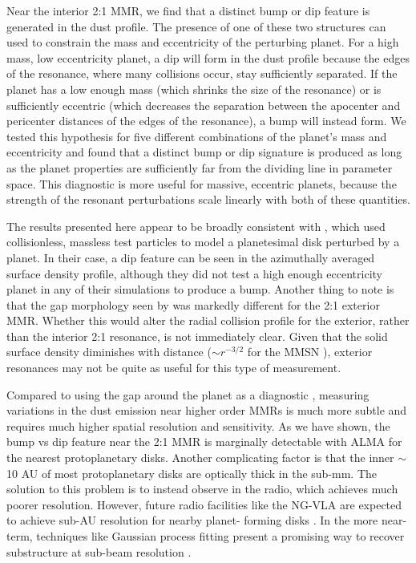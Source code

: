 \documentclass[twocolumn]{aastex63}
\begin{document}
Near the interior 2:1 MMR, we find that a distinct bump or dip feature is generated in the dust profile. The presence of one of these two structures 
can used to constrain the mass and eccentricity of the perturbing planet. For a high mass, low eccentricity planet, a dip will form in the dust profile 
because the edges of the resonance, where many collisions occur, stay sufficiently separated. If the planet has a low enough mass (which shrinks 
the size of the resonance) or is sufficiently eccentric (which decreases the separation between the apocenter and pericenter distances of the edges 
of the resonance), a bump will instead form. We tested this hypothesis for five different combinations of the planet's mass and eccentricity and found 
that a distinct bump or dip signature is produced as long as the planet properties are sufficiently far from the dividing line in parameter space. This 
diagnostic is more useful for massive, eccentric planets, because the strength of the resonant perturbations scale linearly with both of these 
quantities.

The results presented here appear to be broadly consistent with \citet{2016ApJ...818..159T}, which used collisionless, massless test particles to 
model a planetesimal disk perturbed by a planet. In their case, a dip feature can be seen in the azimuthally averaged surface density profile, 
although they did not test a high enough eccentricity planet in any of their simulations to produce a bump. Another thing to note is that the gap 
morphology seen by \citet{2016ApJ...818..159T} was markedly different for the 2:1 exterior MMR. Whether this would alter the radial collision profile 
for the exterior, rather than the interior 2:1 resonance, is not immediately clear.  Given that the solid surface density diminishes with distance 
($\sim r^{-3/2}$ for the MMSN \citep{1981PThPS..70...35H}), exterior resonances may not be quite as useful for this type of measurement.

Compared to using the gap around the planet as a diagnostic \citep{2013ApJ...777L..31D, 2016ApJ...820...29D}, measuring variations in the dust 
emission near higher order MMRs is much more subtle and requires much higher spatial resolution and sensitivity. As we have shown, the bump vs 
dip feature near the 2:1 MMR is marginally detectable with ALMA for the nearest protoplanetary disks. Another complicating factor is that the inner 
$\sim$ 10 AU of most protoplanetary disks are optically thick in the sub-mm. The solution to this problem is to instead observe in the radio, which 
achieves much poorer resolution. However, future radio facilities like the NG-VLA are expected to achieve sub-AU resolution for nearby planet-
forming disks \citep{2018ASPC..517..147R}. In the more near-term, techniques like Gaussian process fitting present a promising way to recover 
substructure at sub-beam resolution \citep{2020arXiv200507709J}.



\clearpage
\end{document}
